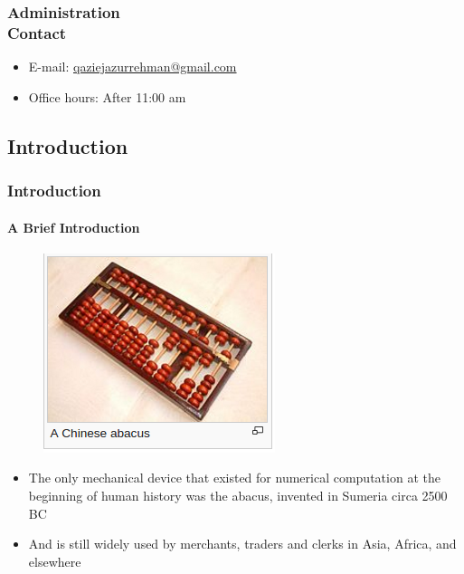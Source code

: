 \documentclass[hyperref={pdfpagelabels=true}]{beamer}
\begin{document}
\begin{frame}
\frametitle{Administration \\ {\large Contact}}
\begin{itemize}
  \item E-mail:  \href{mailto:qaziejazurrehman@gmail.com}{qaziejazurrehman@gmail.com}
  \item Office hours: After 11:00 am
\end{itemize}
\end{frame}

\subsection{Introduction}
\begin{frame}
\frametitle{Introduction}
\framesubtitle{A Brief Introduction}
\begin{figure}[!tbp]
\centering
\includegraphics[scale = 0.55]{figs/Selection_002.png}
\end{figure}
\begin{itemize}
\item[\ding{45}] The only mechanical device that existed for numerical computation at the beginning of human history was the abacus, invented in Sumeria circa 2500 BC
\item[\ding{45}] And is still widely used by merchants, traders and clerks in Asia, Africa, and elsewhere
\end{itemize}
\end{frame}
\end{document}
